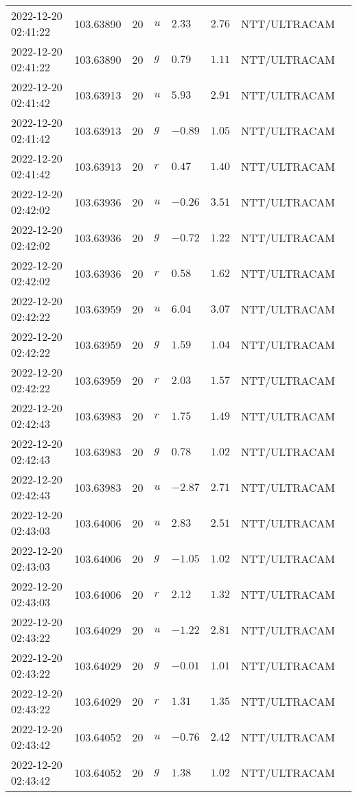 \documentclass{nature_plusfigure}
\begin{document}
\begin{supplement}
\begin{center}
\begin{longtable}{llllllll}
2022-12-20 02:41:22 & 103.63890 & 20 & $u$ & $2.33$ & $2.76$ & NTT/ULTRACAM &  \\ 
2022-12-20 02:41:22 & 103.63890 & 20 & $g$ & $0.79$ & $1.11$ & NTT/ULTRACAM &  \\ 
2022-12-20 02:41:42 & 103.63913 & 20 & $u$ & $5.93$ & $2.91$ & NTT/ULTRACAM &  \\ 
2022-12-20 02:41:42 & 103.63913 & 20 & $g$ & $-0.89$ & $1.05$ & NTT/ULTRACAM &  \\ 
2022-12-20 02:41:42 & 103.63913 & 20 & $r$ & $0.47$ & $1.40$ & NTT/ULTRACAM &  \\ 
2022-12-20 02:42:02 & 103.63936 & 20 & $u$ & $-0.26$ & $3.51$ & NTT/ULTRACAM &  \\ 
2022-12-20 02:42:02 & 103.63936 & 20 & $g$ & $-0.72$ & $1.22$ & NTT/ULTRACAM &  \\ 
2022-12-20 02:42:02 & 103.63936 & 20 & $r$ & $0.58$ & $1.62$ & NTT/ULTRACAM &  \\ 
2022-12-20 02:42:22 & 103.63959 & 20 & $u$ & $6.04$ & $3.07$ & NTT/ULTRACAM &  \\ 
2022-12-20 02:42:22 & 103.63959 & 20 & $g$ & $1.59$ & $1.04$ & NTT/ULTRACAM &  \\ 
2022-12-20 02:42:22 & 103.63959 & 20 & $r$ & $2.03$ & $1.57$ & NTT/ULTRACAM &  \\ 
2022-12-20 02:42:43 & 103.63983 & 20 & $r$ & $1.75$ & $1.49$ & NTT/ULTRACAM &  \\ 
2022-12-20 02:42:43 & 103.63983 & 20 & $g$ & $0.78$ & $1.02$ & NTT/ULTRACAM &  \\ 
2022-12-20 02:42:43 & 103.63983 & 20 & $u$ & $-2.87$ & $2.71$ & NTT/ULTRACAM &  \\ 
2022-12-20 02:43:03 & 103.64006 & 20 & $u$ & $2.83$ & $2.51$ & NTT/ULTRACAM &  \\ 
2022-12-20 02:43:03 & 103.64006 & 20 & $g$ & $-1.05$ & $1.02$ & NTT/ULTRACAM &  \\ 
2022-12-20 02:43:03 & 103.64006 & 20 & $r$ & $2.12$ & $1.32$ & NTT/ULTRACAM &  \\ 
2022-12-20 02:43:22 & 103.64029 & 20 & $u$ & $-1.22$ & $2.81$ & NTT/ULTRACAM &  \\ 
2022-12-20 02:43:22 & 103.64029 & 20 & $g$ & $-0.01$ & $1.01$ & NTT/ULTRACAM &  \\ 
2022-12-20 02:43:22 & 103.64029 & 20 & $r$ & $1.31$ & $1.35$ & NTT/ULTRACAM &  \\ 
2022-12-20 02:43:42 & 103.64052 & 20 & $u$ & $-0.76$ & $2.42$ & NTT/ULTRACAM &  \\ 
2022-12-20 02:43:42 & 103.64052 & 20 & $g$ & $1.38$ & $1.02$ & NTT/ULTRACAM &  \\ 

\end{longtable}
\end{center}
\end{supplement}
\end{document}
